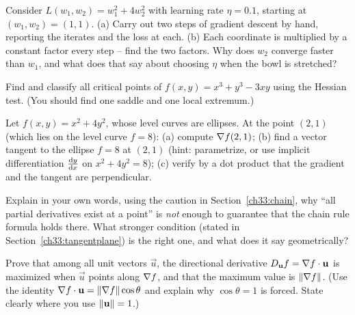 \begin{exercise}
\label{ch33:exr-gd}
Consider $L(w_1,w_2) = w_1^2 + 4w_2^2$ with learning rate $\eta = 0.1$, starting at
$(w_1,w_2)=(1,1)$. (a) Carry out two steps of gradient descent by hand, reporting
the iterates and the loss at each. (b) Each coordinate is multiplied by a constant
factor every step -- find the two factors. Why does $w_2$ converge faster than
$w_1$, and what does that say about choosing $\eta$ when the bowl is stretched?
\end{exercise}

\begin{exercise}
\label{ch33:exr-classify}
Find and classify all critical points of $f(x,y) = x^3 + y^3 - 3xy$ using the
Hessian test. (You should find one saddle and one local extremum.)
\end{exercise}

\begin{exercise}
\label{ch33:exr-perp}
Let $f(x,y) = x^2 + 4y^2$, whose level curves are ellipses. At the point
$(2,1)$ (which lies on the level curve $f=8$): (a) compute $\nabla f(2,1)$;
(b) find a vector tangent to the ellipse $f=8$ at $(2,1)$ (hint: parametrize, or
use implicit differentiation $\frac{\mathrm{d} y}{\mathrm{d} x}$ on $x^2+4y^2=8$); (c) verify by a dot
product that the gradient and the tangent are perpendicular.
\end{exercise}

\begin{exercise}
\label{ch33:exr-concept}
Explain in your own words, using the caution in
Section~\ref{ch33:chain}, why ``all partial derivatives exist at a point'' is
\emph{not} enough to guarantee that the chain rule formula holds there. What
stronger condition (stated in Section~\ref{ch33:tangentplane}) is the right one,
and what does it say geometrically?
\end{exercise}

\begin{exercise}
\label{ch33:exr-proof}
Prove that among all unit vectors $\vec u$, the directional derivative
$D_{\mathbf{u}} f = \nabla f \cdot \mathbf{u}$ is maximized when $\vec u$ points along
$\nabla f$, and that the maximum value is $\lVert\nabla f\rVert$. (Use the
identity $\nabla f \cdot \mathbf{u} = \lVert\nabla f\rVert\cos\theta$ and explain why
$\cos\theta = 1$ is forced. State clearly where you use $\lVert\mathbf{u}\rVert = 1$.)
\end{exercise}

